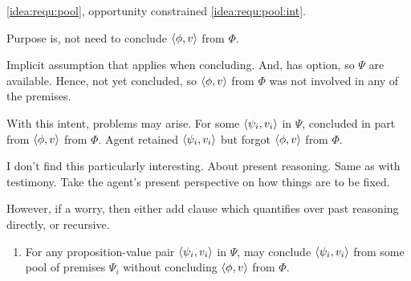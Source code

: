 \begin{note}
  \ref{idea:requ:pool}, opportunity constrained \ref{idea:requ:pool:int}.

  Purpose is, not need to conclude \(\langle \phi, v \rangle\) from \(\Phi\).

  Implicit assumption that \requ{} applies when concluding.
  And, has option, so \(\Psi\) are available.
  Hence, not yet concluded, so \(\langle \phi, v \rangle\) from \(\Phi\) was not involved in any of the premises.

  With this intent, problems may arise.
  For some \(\langle \psi_{i}, v_{i} \rangle\) in \(\Psi\), concluded in part from \(\langle \phi, v \rangle\) from \(\Phi\).
  Agent retained \(\langle \psi_{i}, v_{i} \rangle\) but forgot \(\langle \phi, v \rangle\) from \(\Phi\).

  I don't find this particularly interesting.
  About present reasoning.
  Same as with testimony.
  Take the agent's present perspective on how things are to be fixed.

  However, if a worry, then either add clause which quantifies over past reasoning directly, or recursive.

  \begin{enumerate}
  \item
    \label{idea:requ:pool:ind}
    For any proposition-value pair \(\langle \psi_{i}, v_{i} \rangle\) in \(\Psi\), \vAgent{} may conclude \(\langle \psi_{i}, v_{i} \rangle\) from some pool of premises \(\Psi_{i}\) without concluding \(\langle \phi, v \rangle\) from \(\Phi\).
  \end{enumerate}
\end{note}

\subsection{}
\label{sec:requ3-plus}

